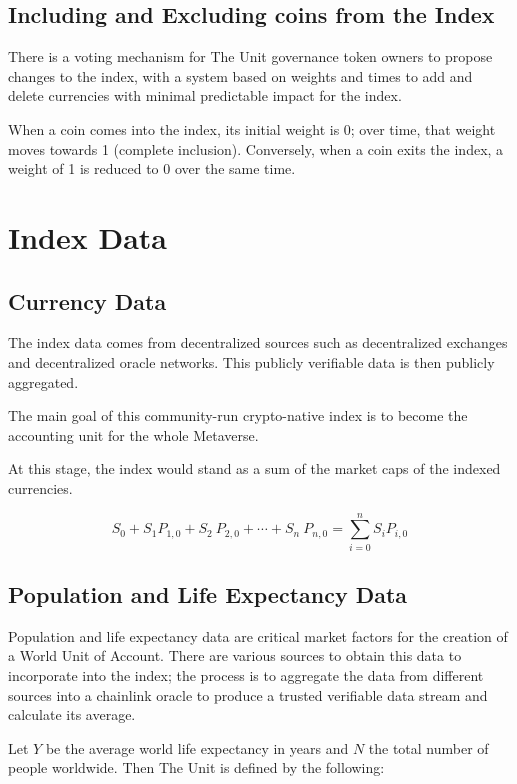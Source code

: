 \documentclass[12pt]{article}
\begin{document}
\subsection{Including and Excluding coins from the Index}

There is a voting mechanism for The Unit governance token owners to propose changes to the index, with a system based on weights and times to add and delete currencies with minimal predictable impact for the index.

When a coin comes into the index, its initial weight is 0; over time, that weight moves towards 1 (complete inclusion). Conversely, when a coin exits the index, a weight of 1 is reduced to 0 over the same time.


\section{Index Data}

\subsection{Currency Data}

The index data comes from decentralized sources such as decentralized exchanges and decentralized oracle networks. This publicly verifiable data is then publicly aggregated.

The main goal of this community-run crypto-native index is to become the accounting unit for the whole Metaverse. 

At this stage, the index would stand as a sum of the market caps of the indexed currencies. 

$$
S_0+S_1 P_{1,0}+ S_2\ P_{2,0}+\cdots+ S_n\ P_{n,0} = \sum_{i=0}^{n} S_iP_{i,0}
$$

\subsection{Population and Life Expectancy Data}

Population and life expectancy data are critical market factors for the creation of a World Unit of Account. There are various sources to obtain this data to incorporate into the index; the process is to aggregate the data from different sources into a chainlink oracle to produce a trusted verifiable data stream and calculate its average. 


Let $Y$ be the average world life expectancy in years and $N$ the total number of people worldwide. Then The Unit is defined by the following:
\end{document}
